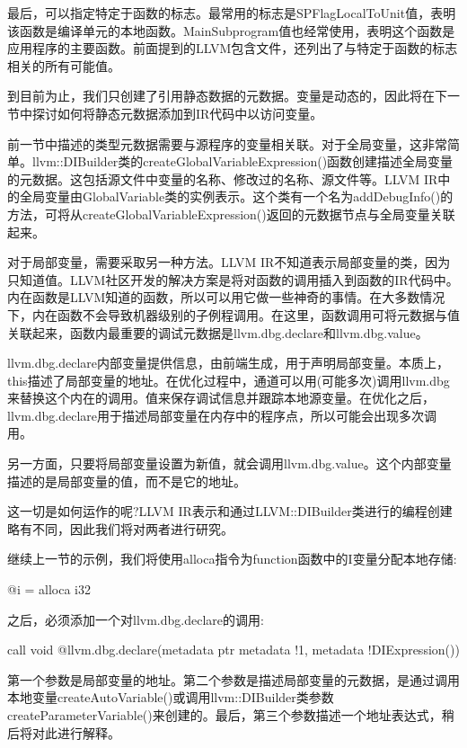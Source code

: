最后，可以指定特定于函数的标志。最常用的标志是SPFlagLocalToUnit值，表明该函数是编译单元的本地函数。MainSubprogram值也经常使用，表明这个函数是应用程序的主要函数。前面提到的LLVM包含文件，还列出了与特定于函数的标志相关的所有可能值。

到目前为止，我们只创建了引用静态数据的元数据。变量是动态的，因此将在下一节中探讨如何将静态元数据添加到IR代码中以访问变量。


前一节中描述的类型元数据需要与源程序的变量相关联。对于全局变量，这非常简单。llvm::DIBuilder类的createGlobalVariableExpression()函数创建描述全局变量的元数据。这包括源文件中变量的名称、修改过的名称、源文件等。LLVM IR中的全局变量由GlobalVariable类的实例表示。这个类有一个名为addDebugInfo()的方法，可将从createGlobalVariableExpression()返回的元数据节点与全局变量关联起来。

对于局部变量，需要采取另一种方法。LLVM IR不知道表示局部变量的类，因为只知道值。LLVM社区开发的解决方案是将对函数的调用插入到函数的IR代码中。内在函数是LLVM知道的函数，所以可以用它做一些神奇的事情。在大多数情况下，内在函数不会导致机器级别的子例程调用。在这里，函数调用可将元数据与值关联起来，函数内最重要的调试元数据是llvm.dbg.declare和llvm.dbg.value。

llvm.dbg.declare内部变量提供信息，由前端生成，用于声明局部变量。本质上，this描述了局部变量的地址。在优化过程中，通道可以用(可能多次)调用llvm.dbg来替换这个内在的调用。值来保存调试信息并跟踪本地源变量。在优化之后，llvm.dbg.declare用于描述局部变量在内存中的程序点，所以可能会出现多次调用。

另一方面，只要将局部变量设置为新值，就会调用llvm.dbg.value。这个内部变量描述的是局部变量的值，而不是它的地址。

这一切是如何运作的呢?LLVM IR表示和通过LLVM::DIBuilder类进行的编程创建略有不同，因此我们将对两者进行研究。

继续上一节的示例，我们将使用alloca指令为function函数中的I变量分配本地存储:

\begin{shell}
@i = alloca i32
\end{shell}

之后，必须添加一个对llvm.dbg.declare的调用:

\begin{shell}
call void @llvm.dbg.declare(metadata ptr %
                metadata !1, metadata !DIExpression())
\end{shell}

第一个参数是局部变量的地址。第二个参数是描述局部变量的元数据，是通过调用本地变量createAutoVariable()或调用llvm::DIBuilder类参数createParameterVariable()来创建的。最后，第三个参数描述一个地址表达式，稍后将对此进行解释。

